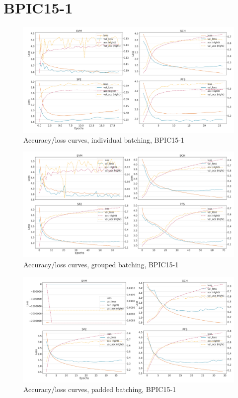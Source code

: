 \section*{BPIC15-1}
\begin{figure}[!htb]
    \centering
    \includegraphics[width=\textwidth]{gfx/bpic2015_1/individual_loss_acc_curve.pdf}
    \caption{Accuracy/loss curves, individual batching, BPIC15-1}
\end{figure}
\begin{figure}[!htb]
    \centering
    \includegraphics[width=\textwidth]{gfx/bpic2015_1/grouped_loss_acc_curve.pdf}
    \caption{Accuracy/loss curves, grouped batching, BPIC15-1}
\end{figure}
\begin{figure}[!htb]
    \centering
    \includegraphics[width=\textwidth]{gfx/bpic2015_1/padded_loss_acc_curve.pdf}
    \caption{Accuracy/loss curves, padded batching, BPIC15-1}
\end{figure}
